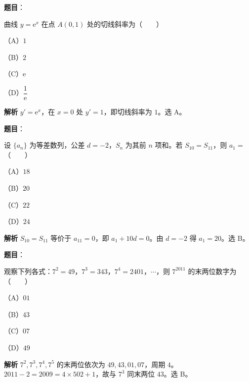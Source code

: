 \begin{answer}

\textbf{题目}：

曲线 $y=\mathrm e^x$ 在点 $A(0,1)$ 处的切线斜率为\mbox{（　　）}

（A）$1$

（B）$2$

（C）$\mathrm e$

（D）$\dfrac1{\mathrm e}$

\textbf{解析}
$y'=\mathrm e^x$，在 $x=0$ 处 $y'=1$，即切线斜率为 $1$。选 A。


\end{answer}
\begin{answer}

\textbf{题目}：

设 $\{a_n\}$ 为等差数列，公差 $d=-2$，$S_n$ 为其前 $n$ 项和。若 $S_{10}=S_{11}$，则 $a_1=$\mbox{（　　）}

（A）$18$

（B）$20$

（C）$22$

（D）$24$

\textbf{解析}
$S_{10}=S_{11}$ 等价于 $a_{11}=0$，即 $a_1+10d=0$。由 $d=-2$ 得 $a_1=20$。选 B。


\end{answer}
\begin{answer}

\textbf{题目}：

观察下列各式：$7^2=49$，$7^3=343$，$7^4=2401$，$\cdots$，则 $7^{2011}$ 的末两位数字为\mbox{（　　）}

（A）$01$

（B）$43$

（C）$07$

（D）$49$

\textbf{解析}
$7^2,7^3,7^4,7^5$ 的末两位依次为 $49,43,01,07$，周期 $4$。$2011-2=2009=4\times502+1$，故与 $7^3$ 同末两位 $43$。选 B。


\end{answer}
